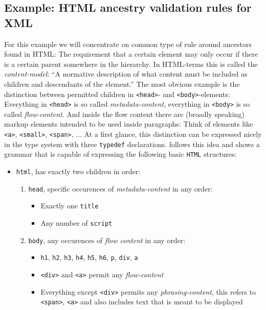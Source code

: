 \documentclass[]{report}
\begin{document}
\subsection{Example: HTML ancestry validation rules for XML}
\label{sec:validate-html-rules-for-xml}

For this example we will concentrate on common type of rule around ancestors found in HTML: The requirement that a certain element may only occur if there is a certain parent somewhere in the hierarchy. In HTML-terms this is called the \textit{content-model}: \enquote{A normative description of what content must be included as children and descendants of the element.} \cite[§3.2.5 Content models]{whatwgHTMLLivingStandard} The most obvious example is the distinction between permitted children in \texttt{<head>}- and \texttt{<body>}-elements: Everything in \texttt{<head>} is so called \textit{metadata-content}, everything in \texttt{<body>} is so called \textit{flow-content}. And inside the flow content there are (broadly speaking) markup elements intended to be used inside paragraphs: Think of elements like \texttt{<a>}, \texttt{<small>}, \texttt{<span>}, ... At a first glance, this distinction can be expressed nicely in the type system with three \texttt{typedef} declarations.  follows this idea and shows a grammar that is capable of expressing the following basic \texttt{HTML} structures:

\begin{itemize}
\item \texttt{html}, has exactly two children in order:
  \begin{enumerate}
  \item \texttt{head}, specific occurences of \textit{metadata-content} in any order:
    \begin{itemize}
    \item Exactly one \texttt{title}
    \item Any number of \texttt{script}
    \end{itemize}
  \item \texttt{body}, any occurences of \textit{flow content} in any order:
    \begin{itemize}
    \item \texttt{h1}, \texttt{h2}, \texttt{h3}, \texttt{h4}, \texttt{h5}, \texttt{h6}, \texttt{p}, \texttt{div}, \texttt{a}
    \item \texttt{<div>} and \texttt{<a>} permit any \textit{flow-content}
    \item Everything except \texttt{<div>} permits any \textit{phrasing-content}, this refers to \texttt{<span>}, \texttt{<a>} and also includes text that is meant to be displayed
    \end{itemize}
  \end{enumerate}
\end{itemize}
\end{document}
